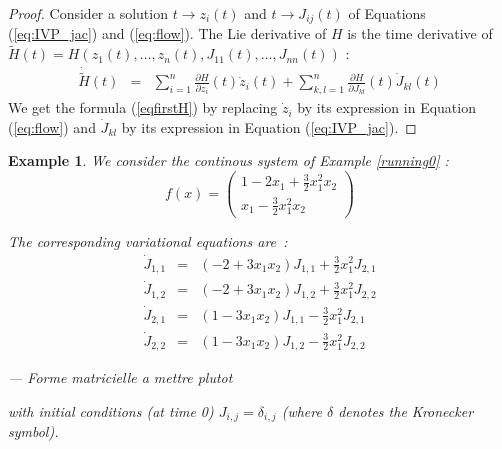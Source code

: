 \documentclass{sig-alternate-05-2015} %
\newcommand\ForAuthors[1]%
 {\par\smallskip                     %
  \begin{center}%
   \fbox%
   {\parbox{0.9\linewidth}%
    {\raggedright\sc--- #1}%
   }%
  \end{center}%
  \par\smallskip                     %
 }
\newtheorem{example}{Example}
\begin{document}
\begin{proof}
Consider a solution $t \rightarrow z_i(t)$ and $t \rightarrow J_{ij}(t)$ of
Equations (\ref{eq:IVP_jac}) and (\ref{eq:flow}). The Lie derivative of $H$
is
the time derivative of $\tilde{H}(t)=H(z_1(t),\ldots,z_n(t),J_{11}(t),\ldots,J_{nn}(t))$ : 
$$\begin{array}{rcl}
\dot{\tilde{H}}(t) & = & \sum\limits_{i=1}^{n} \frac{\partial H}{\partial z_i}(t)
\dot{z}_i(t)+\sum\limits_{k,l=1}^n \frac{\partial H}{\partial J_{kl}}(t) \dot{J}_{kl}(t)
\end{array}$$
We get the formula (\ref{eqfirstH}) by 
replacing $\dot{z}_i$ by its expression in Equation (\ref{eq:flow}) and
$\dot{J}_{kl}$ by its expression in Equation (\ref{eq:IVP_jac}). 
\end{proof}

\begin{example}
\label{running1}
We consider the continous system of Example \ref{running0} : 
$$ f(x) = \left(\begin{array}{l}
1-2 x_1+\frac{3}{2} x_1^2 x_2 \\
x_1-\frac{3}{2} x_1^2x_2
\end{array}\right)$$

The corresponding variational equations are~:
\begin{eqnarray}
\dot{J}_{1,1} & = & (-2+3x_1x_2)J_{1,1} + \frac{3}{2} x^2_1 J_{2,1} \\
\dot{J}_{1,2} & = & (-2+3x_1x_2)J_{1,2} + \frac{3}{2} x^2_1 J_{2,2} \\
\dot{J}_{2,1} & = & (1-3x_1x_2)J_{1,1}-\frac{3}{2} x^2_1 J_{2,1} \\
\dot{J}_{2,2} & = & (1-3x_1x_2)J_{1,2}-\frac{3}{2} x^2_1 J_{2,2} 
\label{jacobian}
\end{eqnarray}
\ForAuthors{Forme matricielle a mettre plutot}
\noindent with initial conditions (at time 0) $J_{i,j}=\delta_{i,j}$ (where $\delta$ denotes
the Kronecker symbol).
\end{example}
\end{document}
